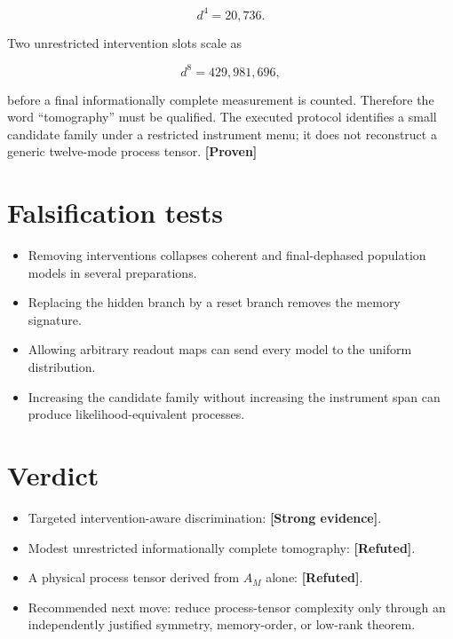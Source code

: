 \documentclass[11pt,a4paper,openany]{report}
\newcommand{\statusProven}{\textcolor{fingreen}{[Proven]}}
\newcommand{\statusStrong}{\textcolor{finblue}{[Strong evidence]}}
\newcommand{\statusRefuted}{\textcolor{finred}{[Refuted]}}
\begin{document}
\[
d^4=20,736.
\]

Two unrestricted intervention slots scale as

\[
d^8=429,981,696,
\]

before a final informationally complete measurement is counted. Therefore the word “tomography” must be qualified. The executed protocol identifies a small candidate family under a restricted instrument menu; it does not reconstruct a generic twelve-mode process tensor. \textbf{\statusProven{}}

\section{Falsification tests}

\begin{itemize}
\item 
Removing interventions collapses coherent and final-dephased population models in several preparations.

\item 
Replacing the hidden branch by a reset branch removes the memory signature.

\item 
Allowing arbitrary readout maps can send every model to the uniform distribution.

\item 
Increasing the candidate family without increasing the instrument span can produce likelihood-equivalent processes.

\end{itemize}

\section{Verdict}

\begin{itemize}
\item 
Targeted intervention-aware discrimination: \textbf{\statusStrong{}}.

\item 
Modest unrestricted informationally complete tomography: \textbf{\statusRefuted{}}.

\item 
A physical process tensor derived from \(A_M\) alone: \textbf{\statusRefuted{}}.

\item 
Recommended next move: reduce process-tensor complexity only through an independently justified symmetry, memory-order, or low-rank theorem.

\end{itemize}
\end{document}
